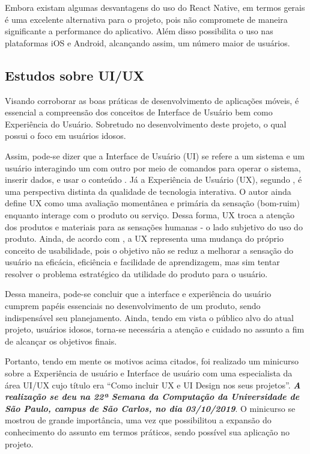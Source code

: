 Embora existam algumas desvantagens do uso do React Native, em termos gerais é uma excelente alternativa para o projeto, pois não compromete de maneira significante a performance do aplicativo. Além disso possibilita o uso nas plataformas iOS e Android, alcançando assim, um número maior de usuários.

\subsection{Estudos sobre UI/UX}
Visando corroborar as boas práticas de desenvolvimento de aplicações móveis, é essencial a compreensão dos conceitos de Interface de Usuário bem como Experiência do Usuário. Sobretudo no desenvolvimento deste projeto, o qual possui o foco em usuários idosos.

Assim, pode-se dizer que a Interface de Usuário (UI) se refere a um sistema e um usuário interagindo um com outro por meio de comandos para operar o sistema, inserir dados, e usar o conteúdo \citep{joo2015}. Já a Experiência de Usuário (UX), segundo \cite{marc2008}, é uma perspectiva distinta da qualidade de tecnologia interativa. O autor ainda define UX como uma avaliação momentânea e primária da sensação (bom-ruim) enquanto interage com o produto ou serviço. Dessa forma, UX troca a atenção dos produtos e materiais para as sensações humanas - o lado subjetivo do uso do produto. Ainda, de acordo com \cite{castilla2017}, a UX representa uma mudança do próprio conceito de usabilidade, pois o objetivo não se reduz a melhorar a sensação do usuário na eficácia, eficiência e facilidade de aprendizagem, mas sim tentar resolver o problema estratégico da utilidade do produto para o usuário. 

Dessa maneira, pode-se concluir que a interface e experiência do usuário cumprem papéis essenciais no desenvolvimento de um produto, sendo indispensável seu planejamento. Ainda, tendo em vista o público alvo do atual projeto, usuários idosos, torna-se necessária a atenção e cuidado no assunto a fim de alcançar os objetivos finais.

Portanto, tendo em mente os motivos acima citados, foi realizado um minicurso sobre a Experiência de usuário e Interface de usuário com uma especialista da área UI/UX cujo título era ``Como incluir UX e UI Design nos seus projetos''. \textbf{\textit{A realização se deu na 22ª Semana da Computação da Universidade de São Paulo, campus de São Carlos, no dia 03/10/2019}}. O minicurso se mostrou de grande importância, uma vez que possibilitou a expansão do conhecimento do assunto em termos práticos, sendo possível sua aplicação no projeto.

